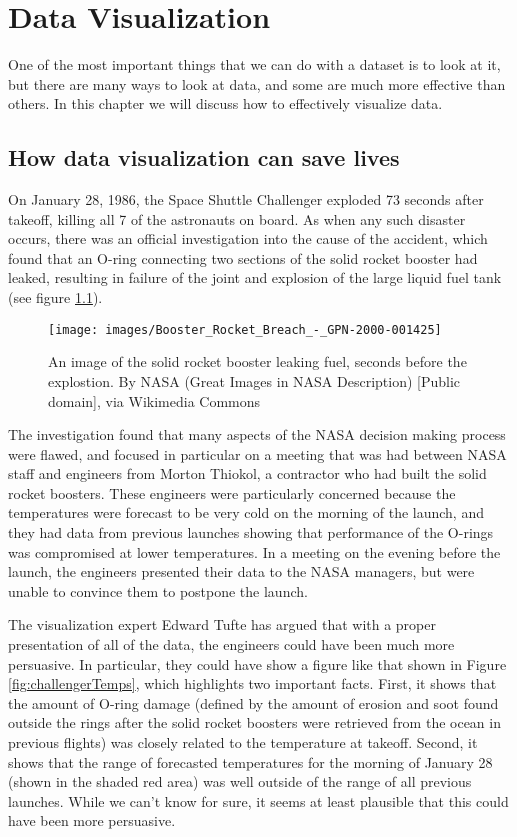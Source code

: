 \documentclass[]{book}
\theoremstyle{definition}
\theoremstyle{definition}
\theoremstyle{definition}
\theoremstyle{remark}
\begin{document}
\chapter{Data Visualization}\label{data-visualization}

One of the most important things that we can do with a dataset is to
look at it, but there are many ways to look at data, and some are much
more effective than others. In this chapter we will discuss how to
effectively visualize data.

\section{How data visualization can save
lives}\label{how-data-visualization-can-save-lives}

On January 28, 1986, the Space Shuttle Challenger exploded 73 seconds
after takeoff, killing all 7 of the astronauts on board. As when any
such disaster occurs, there was an official investigation into the cause
of the accident, which found that an O-ring connecting two sections of
the solid rocket booster had leaked, resulting in failure of the joint
and explosion of the large liquid fuel tank (see figure
\ref{fig:srbLeak}).

\begin{figure}
\texttt{[image: images/Booster\_Rocket\_Breach\_-\_GPN-2000-001425]} \caption{An image of the solid rocket booster leaking fuel, seconds before the explostion. By NASA (Great Images in NASA Description) [Public domain], via Wikimedia Commons}\label{fig:srbLeak}
\end{figure}

The investigation found that many aspects of the NASA decision making
process were flawed, and focused in particular on a meeting that was had
between NASA staff and engineers from Morton Thiokol, a contractor who
had built the solid rocket boosters. These engineers were particularly
concerned because the temperatures were forecast to be very cold on the
morning of the launch, and they had data from previous launches showing
that performance of the O-rings was compromised at lower temperatures.
In a meeting on the evening before the launch, the engineers presented
their data to the NASA managers, but were unable to convince them to
postpone the launch.

The visualization expert Edward Tufte has argued that with a proper
presentation of all of the data, the engineers could have been much more
persuasive. In particular, they could have show a figure like that shown
in Figure \ref{fig:challengerTemps}, which highlights two important
facts. First, it shows that the amount of O-ring damage (defined by the
amount of erosion and soot found outside the rings after the solid
rocket boosters were retrieved from the ocean in previous flights) was
closely related to the temperature at takeoff. Second, it shows that the
range of forecasted temperatures for the morning of January 28 (shown in
the shaded red area) was well outside of the range of all previous
launches. While we can't know for sure, it seems at least plausible that
this could have been more persuasive.
\end{document}
